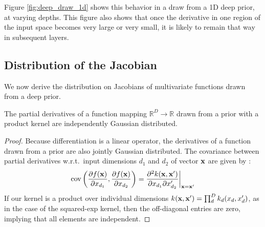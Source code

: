 Figure \ref{fig:deep_draw_1d} shows this behavior in a draw from a 1D deep \gp{} prior, at varying depths.  This figure also shows that once the derivative in one region of the input space becomes very large or very small, it is likely to remain that way in subsequent layers.
%







\subsection{Distribution of the Jacobian}
\label{sec:theorem}

We now derive the distribution on Jacobians of multivariate functions drawn from a deep \gp{} prior.

\begin{lemma}
\label{thm:deriv-ind}
The partial derivatives of a function mapping $\mathbb{R}^D \rightarrow \mathbb{R}$ drawn from a \gp{} prior with a product kernel are independently Gaussian distributed.
\end{lemma}
%
\begin{proof}
Because differentiation is a linear operator, the derivatives of a function drawn from a \gp{} prior are also jointly Gaussian distributed.  The covariance between partial derivatives w.r.t.\ input dimensions $d_1$ and $d_2$ of vector ${\bf{x}}$ are given by \citet{Solak03derivativeobservations}:
%
\begin{align}
\operatorname{cov} \left( \frac{\partial f({\bf{x}})}{\partial x_{d_1}}, \frac{\partial f({\bf{x}})}{\partial x_{d_2}} \right) 
= \frac{\partial^2 k({\bf{x}}, {\bf{x}}')}{\partial x_{d_1} \partial x_{d_2}'} \bigg|_{{\bf{x}}={\bf{x}}'}
\label{eq:deriv-kernel}
\end{align}
%
If our kernel is a product over individual dimensions $k({\bf{x}}, {\bf{x}}') = \prod_d^D k_d(x_d, x_d')$, as in the case of the squared-exp kernel, then the off-diagonal entries are zero, implying that all elements are independent.
\end{proof}

